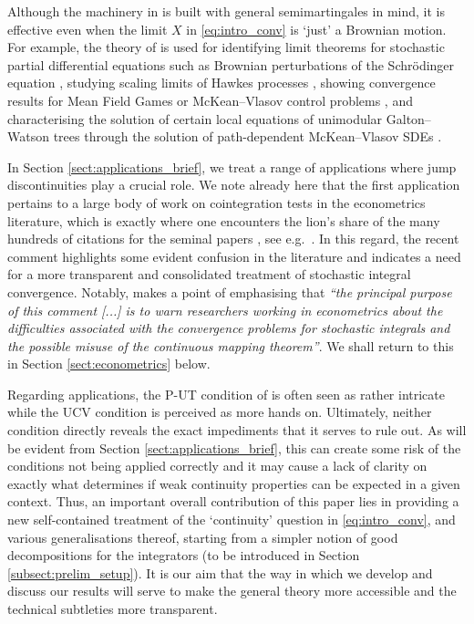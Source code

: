 \documentclass[11pt]{article}
\theoremstyle{definition}\newtheorem{example}[theorem]{Example}
\theoremstyle{definition}\newtheorem{counterexample}[theorem]{Counterexample}
\theoremstyle{definition}\newtheorem{remark}[theorem]{Remark}
\theoremstyle{definition}\newtheorem{defi}[theorem]{Definition}
\numberwithin{equation}{section}
\renewcommand{\|}{\; : \, \;}											%
\begin{document}
Although the machinery in \cite{jakubowskimeminpages, kurtzprotter} is built with general semimartingales in mind, it is effective even when the limit $X$ in \eqref{eq:intro_conv} is `just' a Brownian motion. For example, the theory of \cite{jakubowskimeminpages, kurtzprotter} is used for identifying limit theorems for stochastic partial differential equations such as Brownian perturbations of the Schr\"odinger equation \cite{Pellegrini}, studying scaling limits of Hawkes processes \cite{Rosenbaum}, showing convergence results for Mean Field Games \cite{carmona-delarue-lacker, Lacker2} or McKean--Vlasov control problems \cite{Lacker_limit}, and characterising the solution of certain local equations of unimodular Galton--Watson trees through the solution of path-dependent McKean--Vlasov SDEs \cite{ramanan_lacker}.

In Section \ref{sect:applications_brief}, we treat a range of applications where jump discontinuities play a crucial role. We note already here that the first application pertains to a large body of work on cointegration tests in the econometrics literature, which is exactly where one encounters the lion's share of the many hundreds of citations for the seminal papers \cite{jakubowskimeminpages, kurtzprotter}, see e.g.~\cite{Caner_Hansen,  davis2, davis, Hansen92, ibragimov_phillips_2008, johansen_nielsen, liang_phillips_wang_wang_2016, Park_Phillips2, Wang_book}. In this regard, the recent comment \cite{fabozzi_comment} highlights some evident confusion in the literature and indicates a need for a more transparent and consolidated treatment of stochastic integral convergence. Notably, \cite{fabozzi_comment} makes a point of emphasising that \emph{``the principal purpose of this comment [...] is to warn researchers working in econometrics about the difficulties associated with the convergence problems for stochastic integrals and the possible misuse of the continuous mapping theorem''}. We shall return to this in Section \ref{sect:econometrics} below.

Regarding applications, the P-UT condition of \cite{jakubowskimeminpages} is often seen as rather intricate while the UCV condition \cite{kurtzprotter} is perceived as more hands on. Ultimately, neither condition directly reveals the exact impediments that it serves to rule out. As will be evident from Section \ref{sect:applications_brief}, this can create some risk of the conditions not being applied correctly and it may cause a lack of clarity on exactly what determines if weak continuity properties can be expected in a given context. Thus, an important overall contribution of this paper lies in providing a new self-contained treatment of the `continuity' question in \eqref{eq:intro_conv}, and various generalisations thereof, starting from a simpler notion of good decompositions for the integrators (to be introduced in Section \ref{subsect:prelim_setup}). It is our aim that the way in which we develop and discuss our results will serve to make the general theory more accessible and the technical subtleties more transparent. 
\end{document}

